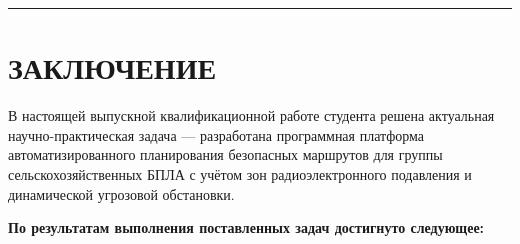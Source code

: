 \begin{center}\rule{0.5\linewidth}{0.5pt}\end{center}

\hypertarget{ux437ux430ux43aux43bux44eux447ux435ux43dux438ux435}{%
\section{ЗАКЛЮЧЕНИЕ}\label{ux437ux430ux43aux43bux44eux447ux435ux43dux438ux435}}

В настоящей выпускной квалификационной работе студента решена актуальная научно-практическая задача --- разработана программная платформа автоматизированного планирования безопасных маршрутов для группы сельскохозяйственных БПЛА с учётом зон радиоэлектронного подавления и динамической угрозовой обстановки.

\textbf{По результатам выполнения поставленных задач достигнуто следующее:}

